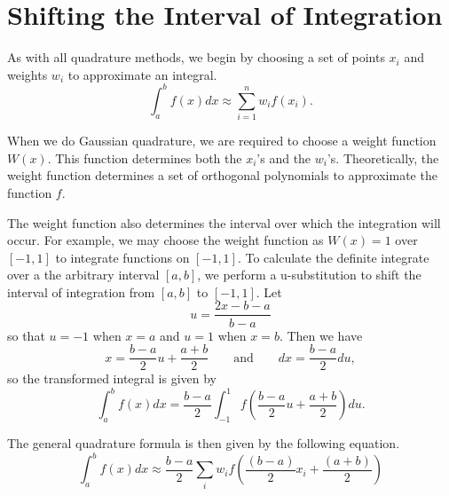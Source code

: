 \label{Lab:GaussQuad}



\section*{Shifting the Interval of Integration} %

As with all quadrature methods, we begin by choosing a set of points $x_i$ and weights $w_i$ to approximate an integral.
\[
\int_{a}^b f(x) dx \approx \sum_{i=1}^n w_if(x_i).
\]

When we do Gaussian quadrature, we are required to choose a weight function $W(x)$.
This function determines both the $x_i$'s and the $w_i$'s. %
Theoretically, the weight function determines a set of orthogonal polynomials to approximate the function $f$.

The weight function also determines the interval over which the integration will occur.
For example, we may choose the weight function as $W(x) = 1$ over $[-1,1]$ to integrate functions on $[-1,1]$.
To calculate the definite integrate over a the arbitrary interval $[a,b]$, we perform a u-substitution to shift the interval of integration from $[a,b]$ to $[-1,1]$.
Let \[u = \frac{2x - b - a}{b - a}\] so that $u = -1$ when $x = a$ and $u = 1$ when $x=b$.
Then we have \[x = \frac{b - a}{2}u + \frac{a + b}{2}\qquad \text{and}\qquad dx = \frac{b - a}{2}du,\] so the transformed integral is given by
\begin{equation}
\int_a^b f(x) dx = \frac{b-a}{2}\int_{-1}^1 f\left(\frac{b-a}{2}u + \frac{a+b}{2}\right)du.
\label{eq:quadrature-usub}
\end{equation}

The general quadrature formula is then given by the following equation.
\[
\int_a^b f(x) dx \approx \frac{b - a}{2} \sum_i w_i f\left(\frac{(b-a)}{2}x_i + \frac{(a+b)}{2}\right)
\]

